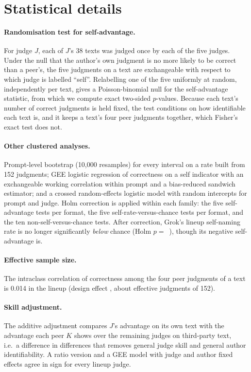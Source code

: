 \section{Statistical details}
\label{app:stats}

\paragraph{Randomisation test for self-advantage.} For judge $J$, each of
$J$'s 38 texts was judged once by each of the five judges. Under the null
that the author's own judgment is no more likely to be correct than a
peer's, the five judgments on a text are exchangeable with respect to which
judge is labelled ``self''. Relabelling one of the five uniformly at random,
independently per text, gives a Poisson-binomial null for the self-advantage
statistic, from which we compute exact two-sided $p$-values. Because each
text's number of correct judgments is held fixed, the test conditions on how
identifiable each text is, and it keeps a text's four peer judgments
together, which Fisher's exact test does not.

\paragraph{Other clustered analyses.} Prompt-level bootstrap (10,000
resamples) for every interval on a rate built from 152 judgments; GEE
logistic regression of correctness on a self indicator with an exchangeable
working correlation within prompt and a bias-reduced sandwich estimator;
and a crossed random-effects logistic model with random intercepts for prompt
and judge. Holm correction is applied within each family: the five
self-advantage tests per format, the five self-rate-versus-chance tests per
format, and the ten non-self-versus-chance tests. After correction, Grok's
lineup self-naming rate is no longer significantly \emph{below} chance
(Holm $p=$~\GrokSelfLineupHolm{}), though its negative self-advantage is.

\paragraph{Effective sample size.} The intraclass correlation of correctness
among the four peer judgments of a text is 0.014 in the lineup (design effect
\PeerDeffLineup{}, about \PeerNeffLineup{} effective judgments of 152).

\paragraph{Skill adjustment.} The additive adjustment compares $J$'s
advantage on its own text with the advantage each peer $K$ shows over the
remaining judges on third-party text, i.e.\ a difference in differences that
removes general judge skill and general author identifiability. A ratio
version and a GEE model with judge and author fixed effects agree in sign
for every lineup judge.

